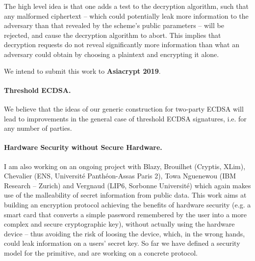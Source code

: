 \documentclass[10pt]{llncs}
\begin{document}
The high level idea is that one adds a test to the decryption algorithm, such that any malformed ciphertext -- which could potentially leak more information to the adversary than that revealed by the scheme's public parameters -- will be rejected, and cause the decryption algorithm to abort. 
This implies that decryption requests do not reveal significantly more information than what an adversary could obtain by choosing a plaintext and encrypting it alone. 

We intend to submit this work to \textbf{Asiacrypt 2019}.

\paragraph{Threshold ECDSA.}
We believe that the ideas of our generic construction for two-party ECDSA will lead to improvements in the general case of threshold ECDSA signatures, i.e. for any number of parties. 

\paragraph{Hardware Security without Secure Hardware.}
I am also working on an ongoing project with Blazy, Brouilhet (Cryptis, XLim), Chevalier (ENS, Université Panthéon-Assas Paris 2), Towa Nguenewou (IBM Research – Zurich) and Vergnaud (LIP6, Sorbonne Université) which again makes use of the malleability of secret information from public data. This work aims at building an encryption protocol achieving the benefits of hardware security (e.g. a smart card that converts a simple password remembered by the user into a more complex and secure cryptographic key), without actually using the hardware device -- thus avoiding the risk of loosing the device, which, in the wrong hands, could leak information on a users' secret key.
%
%
So far we have defined a security model for the primitive, and are working on a concrete protocol.





		
\end{document}
